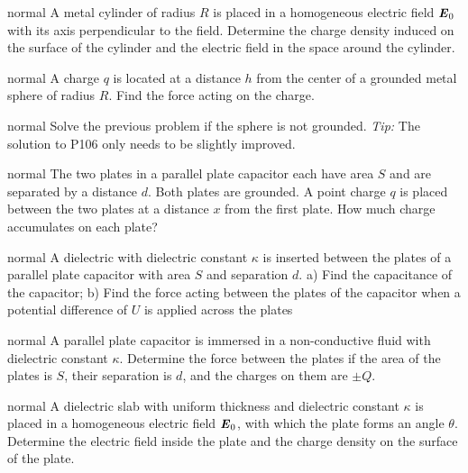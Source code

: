 \hypertarget{P105}{}
\begin{solution}{normal} %
A metal cylinder of radius $R$ is placed in a homogeneous electric field $\textbf{\textit{E}}_0$ with its axis perpendicular to the field. Determine the charge density induced on the surface of the cylinder and the electric field in the space around the cylinder.
\end{solution}

\hypertarget{P106}{}
\begin{solution}{normal} %
A charge $q$ is located at a distance $h$ from the center of a grounded metal sphere of radius $R$. Find the force acting on the charge.
\end{solution}

\hypertarget{P107}{}
\begin{solution}{normal} %
Solve the previous problem if the sphere is not grounded. \textit{Tip:} The solution to P106 only needs to be slightly improved.
\end{solution}

\hypertarget{P108}{}
\begin{solution}{normal} %
The two plates in a parallel plate capacitor each have area $S$ and are separated by a distance $d$. Both plates are grounded. A point charge $q$ is placed between the two plates at a distance $x$ from the first plate. How much charge accumulates on each plate?
\end{solution}

\hypertarget{P109}{}
\begin{solution}{normal} %
A dielectric with dielectric constant $\kappa$ is inserted between the plates of a parallel plate capacitor with area $S$ and separation $d$. a) Find the capacitance of the capacitor; b) Find the force acting between the plates of the capacitor when a potential difference of $U$ is applied across the plates 
\end{solution}

\hypertarget{P110}{}
\begin{solution}{normal} %
A parallel plate capacitor is immersed in a non-conductive fluid with dielectric constant $\kappa$. Determine the force between the plates if the area of the plates is $S$, their separation is $d$, and the charges on them are $\pm Q$.
\end{solution}

\hypertarget{P111}{}
\begin{solution}{normal} %
A dielectric slab with uniform thickness and dielectric constant $\kappa$ is placed in a homogeneous electric field $\textbf{\textit{E}}_0$, with which the plate forms an angle $\theta$. Determine the electric field inside the plate and the charge density on the surface of the plate.
\end{solution}

